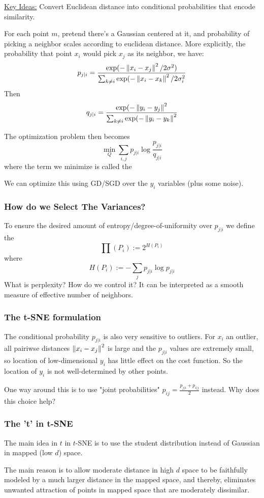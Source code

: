 \documentclass[11pt]{scrartcl}
\begin{document}
\underline{Key Ideas:}
Convert Euclidean distance into conditional probabilities that encode similarity. 

For each point $m$, pretend there's a Gaussian centered at it, and probability of picking a neighbor scales according to euclidean distance. More explicitly, the probability that point $x_i$ would pick $x_j$ as its neighbor, we have:
$$p_{j|i}=\frac{\exp(-\left\lVert x_i-x_j\right\rVert^2/{2\sigma^2})}{\sum_{k \ne i}\exp(-\left\lVert x_i-x_k\right\rVert^2/2\sigma_i^2}$$
Then $$q_{j|i}=\frac{\exp(-\left\lVert y_i-y_j\right\rVert^2}{\sum_{k \ne i}\exp(-\left\lVert y_i-y_k\right\rVert^2}$$

The optimization problem then becomes $$\min_{Q}\sum_{i,j}p_{j|i}\log\frac{p_{j|i}}{q_{j|i}}$$
where the term we minimize is called the 

We can optimize this using GD/SGD over the $y_i$ variables (plus some noise). 

\subsubsection{How do we Select The Variances?}
To ensure the desired amount of entropy/degree-of-uniformity over $p_{j|i}$ we define the 
$$\prod(P_i) := 2^{H(P_i)}$$
where $$H(P_i) := -\sum_{j}p_{j|i}\log{p_{j|i}}$$
What is perplexity? How do we control it? It can be interpreted as a smooth measure of effective number of neighbors. 

\subsubsection{The t-SNE formulation}
The conditional probability $p_{j|i}$ is also very sensitive to outliers. For $x_i$ an outlier, all pairiwse distances $\left\lVert x_i-x_j\right\rVert^2$ is large and the $p_{j|i}$ values are extremely small, so location of low-dimensional $y_i$ has little effect on the cost function. So the location of $y_i$ is not well-determined by other points. 

One way around this is to use "joint probabilities" $p_{ij}=\frac{p_{j|i}+p_{i|j}}{2}$ instead. Why does this choice help? 

\subsubsection{The 't' in t-SNE}
The main idea in $t$ in $t$-SNE is to use the student distribution instead of Gaussian in mapped (low $d$) space. 

The main reason is to allow moderate distance in high $d$ space to be faithfully modeled by a much larger distance in the mapped space, and thereby, eliminates unwanted attraction of points in mapped space that are moderately dissimilar. 
\end{document}
